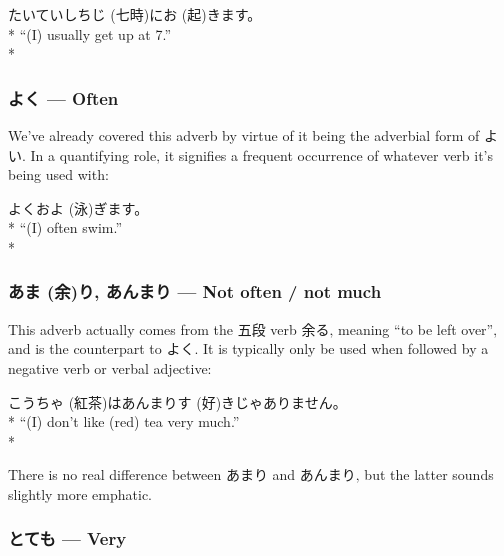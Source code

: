 \documentclass[11pt, b5paper, twoside, openright, onecolumn]{book}
\makeatletter
\newcommand*{\rubystack}[2]{{\relscale{0.5}%
  \begin{tabular}[b]{@{}c@{}}%
    {#1}\\%
   {\textscale{2}{#2}}%
  \end{tabular}}%
}
\DeclareRobustCommand*{\ruby}[2]{%
  \mbox{%
    \setlength{\parskip}{0ex}%
    \BeginAccSupp{method=pdfstringdef,ActualText={#1}}%
      \rubystack{\phantom{#2}}{#1}%
      \llap{%
        \rubystack{#2}{\phantom{#1}}%
      }%
    \EndAccSupp{}%
  }%
}
\renewcommand*{\ruby}[2]{#2 (#1)}%
\newenvironment{exampleblock}{
\setlength{\parindent}{0.6in}
\begin{minipage}[t]{\dimexpr\textwidth-\parindent}}
{\end{minipage}}
\makeatother
\begin{document}
\vspace{0.4cm}
\begin{exampleblock}
たいてい\ruby{七時}{しちじ}に\ruby{起}{お}きます。 \\* 
“(I) usually get up at 7.” \\* 
\end{exampleblock}
\subsubsection{よく — Often}


We’ve already covered this adverb by virtue of it being the adverbial form of よい. In a quantifying role‚ it signifies a frequent occurrence of whatever verb it’s being used with:

\vspace{0.4cm}
\begin{exampleblock}
よく\ruby{泳}{およ}ぎます。 \\* 
“(I) often swim.” \\* 
\end{exampleblock}
\subsubsection{\ruby{余}{あま}り‚ あんまり — Not often / not much}


This adverb actually comes from the 五段 verb 余る‚ meaning “to be left over”‚ and is the counterpart to よく. It is typically only be used when followed by a negative verb or verbal adjective:

\vspace{0.4cm}
\begin{exampleblock}
\ruby{紅茶}{こうちゃ}はあんまり\ruby{好}{す}きじゃありません。 \\* 
“(I) don’t like (red) tea very much.” \\* 
\end{exampleblock}
\vspace{0.2cm}

There is no real difference between あまり and あんまり‚ but the latter sounds slightly more emphatic.

\subsubsection{とても — Very}
\end{document}
